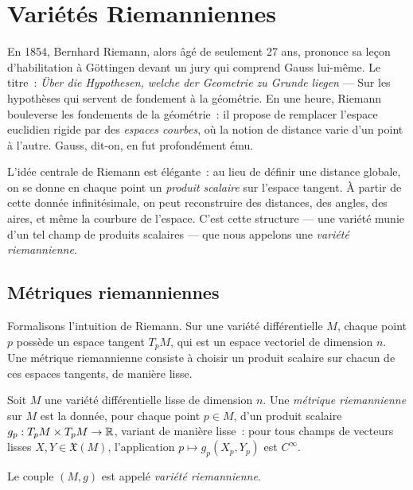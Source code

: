 \chapter{Vari\'et\'es Riemanniennes}
\label{ch:varietes}

En 1854, Bernhard Riemann, alors \^ag\'e de seulement 27 ans, prononce sa
le\c{c}on d'habilitation \`a G\"ottingen devant un jury qui comprend Gauss
lui-m\^eme. Le titre~: \emph{\"Uber die Hypothesen, welche der Geometrie zu
Grunde liegen} --- \og Sur les hypoth\`eses qui servent de fondement \`a la
g\'eom\'etrie\fg. En une heure, Riemann bouleverse les fondements de la
g\'eom\'etrie~: il propose de remplacer l'espace euclidien rigide par des
\emph{espaces courbes}, o\`u la notion de distance varie d'un point \`a
l'autre. Gauss, dit-on, en fut profond\'ement \'emu.

L'id\'ee centrale de Riemann est \'el\'egante~: au lieu de d\'efinir une distance
globale, on se donne en chaque point un \emph{produit scalaire} sur
l'espace tangent. \`A partir de cette donn\'ee infinit\'esimale, on peut
reconstruire des distances, des angles, des aires, et m\^eme la courbure de
l'espace. C'est cette structure --- une vari\'et\'e munie d'un tel champ de
produits scalaires --- que nous appelons une \emph{vari\'et\'e riemannienne}.

\section{M\'etriques riemanniennes}

Formalisons l'intuition de Riemann. Sur une vari\'et\'e diff\'erentielle $M$,
chaque point $p$ poss\`ede un espace tangent $T_pM$, qui est un espace
vectoriel de dimension $n$. Une m\'etrique riemannienne consiste \`a choisir
un produit scalaire sur chacun de ces espaces tangents, de mani\`ere lisse.

\begin{definition}
Soit $M$ une vari\'et\'e diff\'erentielle lisse de dimension $n$. Une \emph{m\'etrique
riemannienne} sur $M$ est la donn\'ee, pour chaque point $p \in M$, d'un produit
scalaire $g_p : T_pM \times T_pM \to \mathbb{R}$, variant de mani\`ere lisse~: pour tous
champs de vecteurs lisses $X, Y \in \mathfrak{X}(M)$, l'application
$p \mapsto g_p(X_p, Y_p)$ est $C^\infty$.

Le couple $(M, g)$ est appel\'e \emph{vari\'et\'e riemannienne}.
\end{definition}

